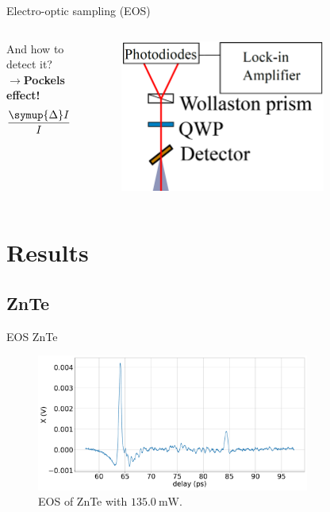\documentclass[aspectratio=1610, 9pt]{beamer}
\begin{document}
\begin{frame}[t]{Electro-optic sampling (EOS)}
\begin{columns}
  \begin{column}{.5\textwidth}
  And how to detect it?\\
  \vspace{0.3in}
  $\rightarrow$\textbf{Pockels effect!}\nocite{THZ_eltric_field}
  \vspace{0.1in}
    \begin{equation}
      \frac{\symup{\Delta}I}{I} = \text{sin}(\theta) = \frac{2\pi}{\lambda} n_0^3 l r E_\text{THz}
    \end{equation}
  \end{column}
  \begin{column}{.5\textwidth}
    \vspace{0.3in}
    \begin{figure}
      \centering
      \includegraphics[width=0.8\textwidth]{images/detectionunit.png}
    \end{figure}
  \end{column}
\end{columns}
\end{frame}

\section{Results}
\subsection{ZnTe}
\begin{frame}{EOS ZnTe}
\begin{figure}
  \includegraphics[width=0.8\textwidth]{images/2_11_30_20normalX.pdf}
  \caption{\textcolor{tugreen}{EOS} of ZnTe with $\SI{135.0}{\milli\W}$.}
\end{figure}
\end{frame}
\end{document}
